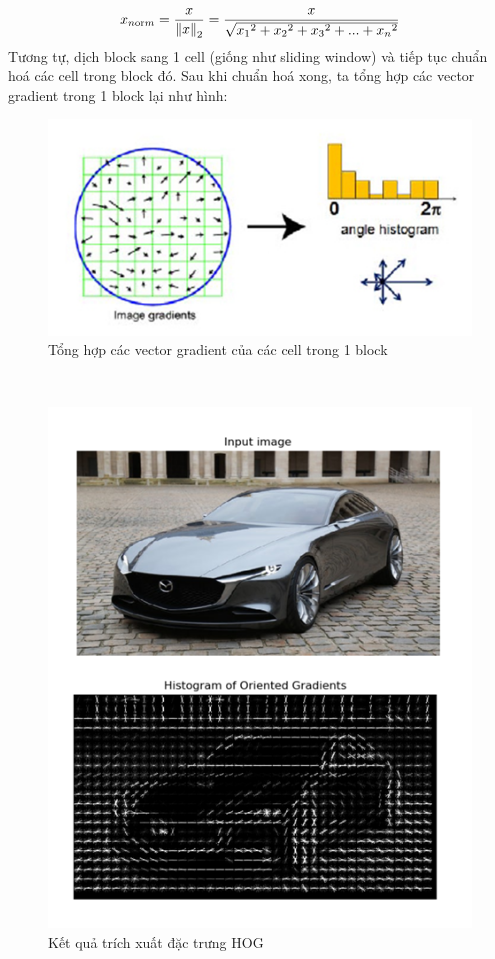 \documentclass[10pt,conference,a4paper]{IEEEtran}
\makeatletter
\def\ScaleIfNeeded{\ifdim\Gin@nat@width>\linewidth\linewidth\else\Gin@nat@width\fi}
\makeatother
\begin{document}
\[ {x_{n{\rm{or}}m}} = \frac{x}{{{{\left\| x \right\|}_2}}} = \frac{x}{{\sqrt {{x_1}^2 + {x_2}^2 + {x_3}^2 + ... + {x_n}^2} }} \]
\linebreak
Tương tự, dịch block sang 1 cell (giống như sliding window) và tiếp tục chuẩn hoá các cell trong block đó.
Sau khi chuẩn hoá xong, ta tổng hợp các vector gradient trong 1 block lại như hình:
\begin{figure}[ht]
	\centering
	\includegraphics[width=\ScaleIfNeeded]{"gradient vector 3"}
	\caption{Tổng hợp các vector gradient của các cell trong 1 block}
	\label{fig:gradient-vector-3}
\end{figure}\\

\begin{figure}[!h]
	\centering
	\includegraphics[height=0.9\linewidth]{HOG}
	\caption{Kết quả trích xuất đặc trưng HOG}
	\label{fig:hog}
\end{figure}
\end{document}

